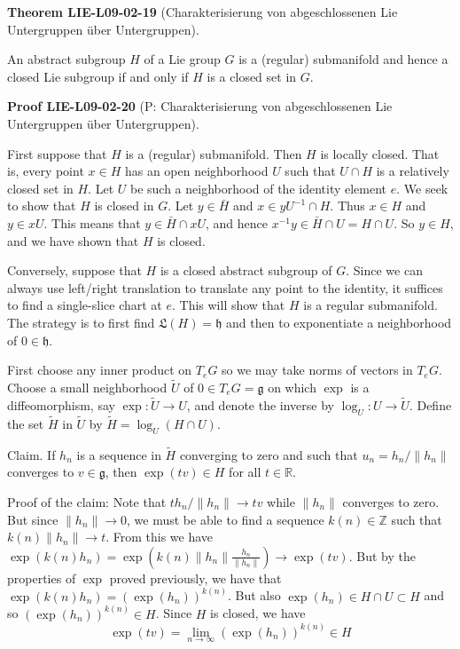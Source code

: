 \documentclass[10pt, letterpaper]{article}
\newcommand{\CustomHeading}[3]{%
  \par\medskip\noindent%
  \textbf{#1 #2} \textnormal{(#3)}.\enskip%
}
\newenvironment{THEO}[2]{\CustomHeading{Theorem}{#1}{#2}}{}
\newenvironment{PROOF}[2]{\CustomHeading{Proof}{#1}{#2}}{}
\begin{document}
\begin{THEO}{LIE-L09-02-19}{Charakterisierung von abgeschlossenen Lie Untergruppen über Untergruppen}
An abstract subgroup $H$ of a Lie group $G$ is a (regular) submanifold and hence a closed Lie subgroup if and only if $H$ is a closed set in $G$.
\end{THEO}

\begin{PROOF}{LIE-L09-02-20}{P: Charakterisierung von abgeschlossenen Lie Untergruppen über Untergruppen}
First suppose that $H$ is a (regular) submanifold. Then $H$ is locally closed. That is, every point $x \in H$ has an open neighborhood $U$ such that $U \cap H$ is a relatively closed set in $H$. Let $U$ be such a neighborhood of the identity element $e$. We seek to show that $H$ is closed in $G$. Let $y \in \bar{H}$ and $x \in y U^{-1} \cap H$. Thus $x \in H$ and $y \in x U$. This means that $y \in \bar{H} \cap x U$, and hence $x^{-1} y \in \bar{H} \cap U=H \cap U$. So $y \in H$, and we have shown that $H$ is closed.

Conversely, suppose that $H$ is a closed abstract subgroup of $G$. Since we can always use left/right translation to translate any point to the identity, it suffices to find a single-slice chart at $e$. This will show that $H$ is a regular submanifold. The strategy is to first find $\mathfrak{L}(H)=\mathfrak{h}$ and then to exponentiate a neighborhood of $0 \in \mathfrak{h}$.

First choose any inner product on $T_{e} G$ so we may take norms of vectors in $T_{e} G$. Choose a small neighborhood $\widetilde{U}$ of $0 \in T_{e} G=\mathfrak{g}$ on which $\exp$ is a diffeomorphism, say $\exp : \widetilde{U} \rightarrow U$, and denote the inverse by $\log _{U}: U \rightarrow \widetilde{U}$. Define the set $\widetilde{H}$ in $\widetilde{U}$ by $\widetilde{H}=\log _{U}(H \cap U)$.

Claim. If $h_{n}$ is a sequence in $\widetilde{H}$ converging to zero and such that $u_{n}=h_{n} /\left\|h_{n}\right\|$ converges to $v \in \mathfrak{g}$, then $\exp (t v) \in H$ for all $t \in \mathbb{R}$.

Proof of the claim: Note that $t h_{n} /\left\|h_{n}\right\| \rightarrow t v$ while $\left\|h_{n}\right\|$ converges to zero. But since $\left\|h_{n}\right\| \rightarrow 0$, we must be able to find a sequence $k(n) \in \mathbb{Z}$ such that $k(n)\left\|h_{n}\right\| \rightarrow t$. From this we have $\exp \left(k(n) h_{n}\right)=\exp \left(k(n)\left\|h_{n}\right\| \frac{h_{n}}{\left\|h_{n}\right\|}\right) \rightarrow \exp (t v)$. But by the properties of $\exp$ proved previously, we have that $\exp \left(k(n) h_{n}\right)=\left(\exp \left(h_{n}\right)\right)^{k(n)}$. But also $\exp \left(h_{n}\right) \in H \cap U \subset H$ and so $\left(\exp \left(h_{n}\right)\right)^{k(n)} \in H$. Since $H$ is closed, we have
$$
\exp (t v)=\lim _{n \rightarrow \infty}\left(\exp \left(h_{n}\right)\right)^{k(n)} \in H
$$


\end{PROOF}
\end{document}
